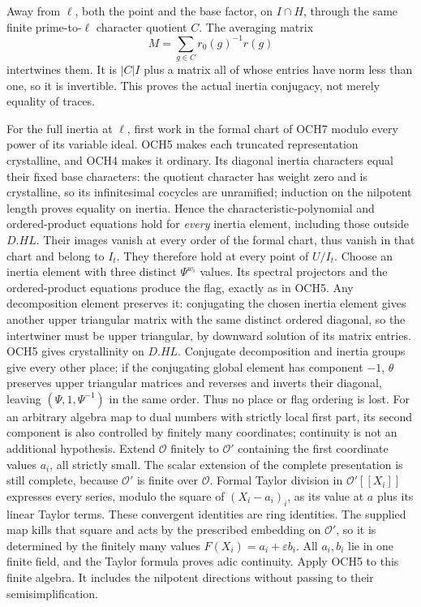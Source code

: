 Away from \(\ell\), both the point and the base factor, on
\(I\cap H\), through the same finite prime-to-\(\ell\)
character quotient \(C\).  The averaging matrix
\[
              M=\sum_{g\in C}r_0(g)^{-1}r(g)
\]
intertwines them.  It is \(|C|I\) plus a matrix all of whose
entries have norm less than one, so it is invertible.  This proves
the actual inertia conjugacy, not merely equality of traces.

For the full inertia at \(\ell\), first work in the formal
chart of OCH7 modulo every power of its variable ideal.  OCH5
makes each truncated representation crystalline, and OCH4 makes
it ordinary.  Its diagonal inertia characters equal their fixed
base characters: the quotient character has weight zero and is
crystalline, so its infinitesimal cocycles are unramified; induction
on the nilpotent length proves equality on inertia.  Hence the
characteristic-polynomial and ordered-product equations hold for
\emph{every} inertia element, including those outside \(D.HL\).
Their images vanish at every order of the formal chart, thus vanish
in that chart and belong to \(I_t\).  They therefore hold at
every point of \(U/I_t\).
Choose an inertia element with three distinct \(\Psi^{w_i}\)
values.  Its spectral projectors and the ordered-product equations
produce the flag, exactly as in OCH5.  Any decomposition element
preserves it: conjugating the chosen inertia element gives another
upper triangular matrix with the same distinct ordered diagonal,
so the intertwiner must be upper triangular, by downward solution
of its matrix entries.  OCH5 gives crystallinity on \(D.HL\).
Conjugate decomposition and inertia groups give every other place;
if the conjugating global element has component \(-1\),
\(\theta\) preserves upper triangular matrices and reverses
and inverts their diagonal, leaving \((\Psi,1,\Psi^{-1})\)
in the same order.  Thus no place or flag ordering is lost.
For an arbitrary algebra map to dual numbers with strictly local
first part, its second component is also controlled by finitely many
coordinates; continuity is not an additional hypothesis.  Extend
\(\mathcal O\) finitely to \(\mathcal O'\) containing
the first coordinate values \(a_i\), all strictly small.
The scalar extension of the complete presentation is still complete,
because \(\mathcal O'\) is finite over \(\mathcal O\).
Formal Taylor division in \(\mathcal O'[[X_i]]\) expresses
every series, modulo the square of \((X_i-a_i)_i\), as its
value at \(a\) plus its linear Taylor terms.  These convergent
identities are ring identities.  The supplied map kills that square
and acts by the prescribed embedding on \(\mathcal O'\),
so it is determined by the finitely many values
\(F(X_i)=a_i+\varepsilon b_i\).  All \(a_i,b_i\) lie in
one finite field, and the Taylor formula proves adic continuity.
Apply OCH5 to this finite algebra.  It includes the nilpotent
directions without passing to their semisimplification.


